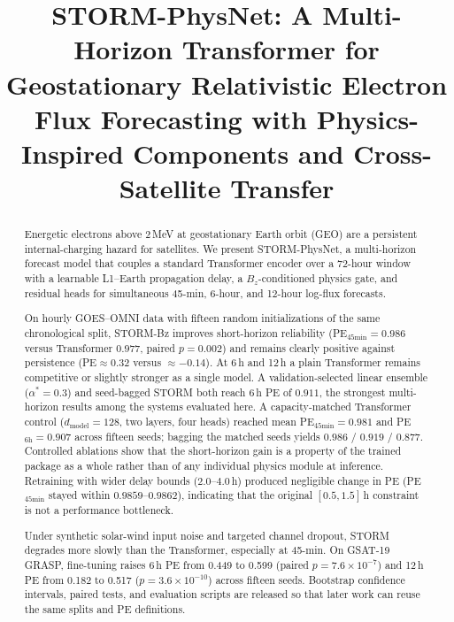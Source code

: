 \documentclass[conference]{IEEEtran}
\title{STORM-PhysNet: A Multi-Horizon Transformer for Geostationary Relativistic Electron Flux Forecasting with Physics-Inspired Components and Cross-Satellite Transfer}
\author{
\IEEEauthorblockN{Samarth BN}
\IEEEauthorblockA{BE in Electronics and Communication\\
RV College of Engineering, Bengaluru, India\\
Email: samarthbn.ec25@rvce.edu.in}
}
\begin{document}
\maketitle

\begin{abstract}
Energetic electrons above 2\,MeV at geostationary Earth orbit (GEO)
are a persistent internal-charging hazard for satellites. We present
STORM-PhysNet, a multi-horizon forecast model that couples a standard
Transformer encoder over a 72-hour window with a learnable L1--Earth
propagation delay, a \(B_z\)-conditioned physics gate, and residual
heads for simultaneous 45-min, 6-hour, and 12-hour log-flux
forecasts.

On hourly GOES--OMNI data with fifteen random initializations of the same chronological split, STORM-Bz improves short-horizon reliability (PE$_{45\mathrm{min}}=0.986$ versus Transformer $0.977$, paired $p = 0.002$) and remains clearly positive against persistence (PE$\approx0.32$ versus $\approx-0.14$). At 6\,h and 12\,h a plain Transformer remains competitive or slightly stronger as a single model. A validation-selected linear ensemble ($\alpha^*=0.3$) and seed-bagged STORM both reach 6\,h PE of $0.911$, the strongest multi-horizon results among the systems evaluated here. A capacity-matched Transformer control ($d_{\mathrm{model}}=128$, two layers, four heads) reached mean PE$_{45\mathrm{min}}=0.981$ and PE$_{6\mathrm{h}}=0.907$ across fifteen seeds; bagging the matched seeds yields $0.986$ / $0.919$ / $0.877$. Controlled ablations show that the short-horizon gain is a property of the trained package as a whole rather than of any individual physics module at inference. Retraining with wider delay bounds ($2.0$--$4.0$\,h) produced negligible change in PE (PE$_{45\mathrm{min}}$ stayed within $0.9859$--$0.9862$), indicating that the original $[0.5, 1.5]$\,h constraint is not a performance bottleneck.

Under synthetic solar-wind input noise and targeted channel dropout,
STORM degrades more slowly than the Transformer, especially at
45-min. On GSAT-19 GRASP, fine-tuning raises 6\,h PE from
0.449 to 0.599 (paired \(p=7.6\times10^{-7}\)) and 12\,h PE from
0.182 to 0.517 (\(p=3.6\times10^{-10}\)) across fifteen seeds.
Bootstrap confidence intervals, paired tests, and evaluation scripts
are released so that later work can reuse the same splits and PE
definitions.
\end{abstract}
\end{document}
